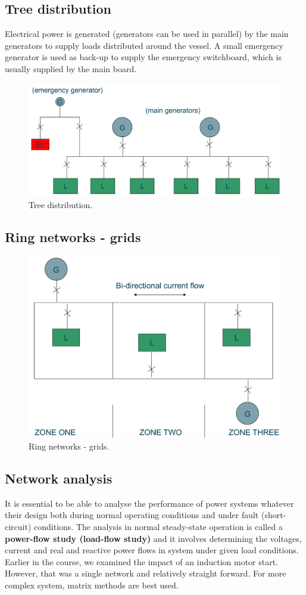 \subsection{Tree distribution}
Electrical power is generated (generators can be used in parallel) by the main generators to supply loads distributed around the vessel. A small emergency generator is used as back-up to supply the emergency switchboard, which is usually supplied by the main board.
\begin{figure}[H]
	\centering
	\includegraphics[width = \textwidth]{./img/figure47.png}
	\caption{Tree distribution.}
\end{figure}
\subsection{Ring networks - grids}
\begin{figure}[H]
	\centering
	\includegraphics[width = \textwidth]{./img/figure48.png}
	\caption{Ring networks - grids.}
\end{figure}
\subsection{Network analysis}
It is essential to be able to analyse the performance of power systems whatever their design both during normal operating conditions and under fault (short-circuit) conditions. The analysis in normal steady-state operation is called a \textbf{power-flow study (load-flow study)} and it involves determining the voltages, current and real and reactive power flows in system under given load conditions. Earlier in the course, we examined the impact of an induction motor start. However, that was a single network and relatively straight forward. For more complex system, matrix methods are best used.

